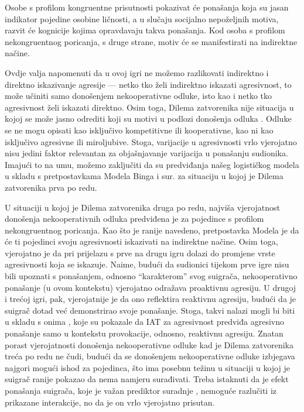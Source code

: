\documentclass[a4paper, 12pt]{report}
\begin{document}
Osobe s profilom kongruentne prisutnosti pokazivat
će ponašanja koja su jasan indikator pojedine osobine ličnosti, a u slučaju
socijalno nepoželjnih motiva, razvit će kognicije kojima opravdavaju takva
ponašanja. Kod osoba s profilom nekongruentnog poricanja, s druge strane, motiv
će se manifestirati na indirektne načine. 

Ovdje valja
napomenuti da u ovoj igri ne možemo razlikovati indirektno i direktno
iskazivanje agresije --- netko tko želi indirektno iskazati agresivnost, to može
učiniti samo donošenjem nekooperativne odluke, isto kao i netko tko agresivnost želi
iskazati direktno.
Osim toga, Dilema zatvorenika nije situacija u
kojoj se može jasno odrediti koji su motivi u podlozi donošenja odluka \citep{colgt}.
Odluke se ne mogu opisati kao isključivo kompetitivne ili kooperativne, kao ni
kao isključivo agresivne ili miroljubive. Stoga, varijacije u agresivnosti
vrlo vjerojatno nisu jedini faktor relevantan za objašnjavanje varijacija u
ponašanju sudionika. 
Imajući to na umu, možemo
zaključiti da su predviđanja našeg logističkog modela u skladu s pretpostavkama 
Modela Binga i sur. \citeyearpar{bing2007integrating}
za situaciju u kojoj je Dilema zatvorenika prva po redu. 

U situaciji u kojoj je Dilema zatvorenika druga po redu, najviša vjerojatnost
donošenja nekooperativnih odluka predviđena je za pojedince s profilom
nekongruentnog poricanja. Kao što je ranije navedeno, pretpostavka Modela je da
će ti pojedinci svoju agresivnosti iskazivati na indirektne načine. 
Osim toga, vjerojatno je da pri prijelazu s prve na drugu igru dolazi do
promjene vrste agresivnosti koja se iskazuje. Naime, budući da 
sudionici tijekom prve igre nisu bili upoznati s ponašanjem, odnosno
\enquote{karakterom} svog suigrača, nekooperativno ponašanje (u ovom kontekstu)
vjerojatno odražava proaktivnu agresiju. U drugoj i trećoj igri, pak,
vjerojatnije je da ono reflektira reaktivnu agresiju, budući da je suigrač dotad
već demonstrirao svoje ponašanje. Stoga, takvi nalazi mogli bi biti u
skladu s onima \citet{richetin2010predictive}, koje su pokazale da IAT za
agresivnost predviđa agresivno ponašanje samo u kontekstu provokacije, odnosno,
reaktivnu agresiju.
Znatan porast vjerojatnosti donošenja
nekooperativne odluke kad je Dilema zatvorenika treća po redu ne čudi, budući da
se donošenjem nekooperativne odluke izbjegava najgori mogući ishod za pojedinca,
što ima posebnu težinu u situaciji u kojoj je suigrač ranije pokazao da
nema namjeru surađivati. Treba istaknuti da je efekt ponašanja suigrača, koje
je važan prediktor suradnje \citep{balliet2013trust}, nemoguće razlučiti iz
prikazane interakcije, no da je on vrlo vjerojatno prisutan.
\end{document}
